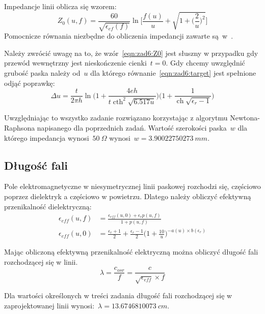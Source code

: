 \documentclass[rep.tex]{subfiles}
\begin{document}
Impedancje linii oblicza się wzorem:
\begin{equation}
  Z_0(u, f) = \frac{60}{\sqrt{\epsilon_{ef}(f)}} \ln\Bigg[\frac{f(u)}{u} + \sqrt{1 + \bigg(\frac{2}{u}\bigg)^2}\Bigg] \label{eqn:zad6:Z0}
\end{equation}
Pomocnicze równania niezbędne do obliczenia impedancji zawarte są~w~\cite{obwody}.

Należy zwrócić uwagę na to, że wzór~\ref{eqn:zad6:Z0} jest słuszny w przypadku gdy przewód wewnętrzny jest nieskończenie cienki~$t = 0$.
Gdy chcemy uwzględnić grubość paska należy od~$u$ dla którego równanie~\ref{eqn:zad6:target} jest spełnione odjąć poprawkę:
\begin{equation}
  \Delta u = \frac{t}{2 \pi h}\ln\Big( 1 + \frac{4eh}{t\operatorname{cth}^2\sqrt{6.517u}}\Big)\Big(1 + \frac{1}{\operatorname{ch}\sqrt{\epsilon_r - 1}}\Big) \label{eqn:zad6:du}
\end{equation}

Uwzględniając to wszystko zadanie rozwiązano korzystając z algorytmu Newtona-Raphsona napisanego dla poprzednich zadań.
Wartość szerokości paska~$w$ dla którego impedancja wynosi~$50~\Omega$ wynosi~$w = 3.90022750273~mm$.

\subsection{Długość fali}
Pole elektromagnetyczne w niesymetrycznej linii paskowej rozchodzi się, częściowo poprzez dielektryk a częściowo w powietrzu.
Dlatego należy obliczyć efektywną przenikalność dielektryczną:
\begin{align}
  \epsilon_{eff}(u, f) &= \frac{\epsilon_{eff}(u, 0) + \epsilon_rp(u, f)}{1 + p(u, f)} \\
  \epsilon_{eff}(u, 0) &= \frac{\epsilon_r + 1}{2} + \frac{\epsilon_r - 1}{2}\Big(1 + \frac{10}{u}\Big)^{-a(u)\times b(\epsilon_r)}
\end{align}

Mając obliczoną efektywną przenikalność elektryczną można obliczyć długość fali rozchodzącej się w linii.
\begin{equation}
  \lambda = \frac{c_{osr}}{f} = \frac{c}{\sqrt{\epsilon_{eff}}\times f} \label{eqn:zad6:lambda}
\end{equation}

Dla wartości określonych w treści zadania długość fali rozchodzącej się w zaprojektowanej linii wynosi:~$\lambda = 13.6746810073~cm$.
\end{document}

